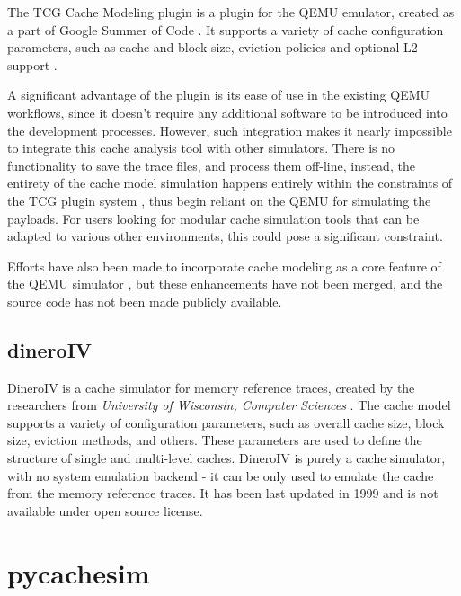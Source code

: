 The TCG Cache Modeling plugin is a plugin for the QEMU emulator, created as a part of Google Summer of Code \cite{qemucachegsoc}. It supports a variety of cache configuration parameters, such as
cache and block size, eviction policies and optional L2 support \cite{tcgcachemodelling}.

A significant advantage of the plugin is its ease of use in the existing QEMU workflows, since it doesn't require any additional software to be introduced into the development processes.
However, such integration makes it nearly impossible to integrate this cache analysis tool with other simulators. There is no functionality to save the trace files, and process them off-line,
instead, the entirety of the cache model simulation happens entirely within the constraints of the TCG plugin system \cite{qemutcgplugindocs}, thus begin reliant on the QEMU for simulating the
payloads. For users looking for modular cache simulation tools that can be adapted to various other environments, this could pose a significant constraint.

\vspace{10px}
\noindent Efforts have also been made to incorporate cache modeling as a core feature of the QEMU simulator \cite{qemucacheattempt}, but these enhancements have not been merged, and the
source code has not been made publicly available.

\subsection{dineroIV}

DineroIV is a cache simulator for memory reference traces, created by the researchers from \textit{University of Wisconsin, Computer Sciences} \cite{dinero}. 
The cache model supports a variety of configuration parameters, such as overall cache size, block size, eviction methods, and others. These parameters are used to define the structure of
single and multi-level caches. DineroIV is purely a cache simulator, with no system emulation backend - it can be only used to emulate the cache from the memory reference traces.
It has been last updated in 1999 and is not available under open source license.

\section{pycachesim}

